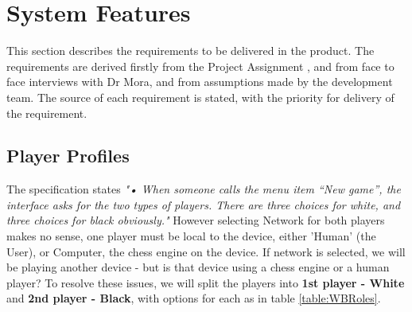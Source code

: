 \documentclass[a4paper,10pt]{article}
\begin{document}
\section{System Features}

This section describes the requirements to be delivered in the product. The requirements are derived firstly from the Project Assignment  , and from face to face interviews with Dr Mora, and from assumptions made by the development team. The source of each requirement is stated, with the priority for delivery of the requirement. 


\subsection{Player Profiles}

The specification states \textit{"• When someone calls the menu item “New game”, the interface asks for the two types of players. There are three choices for white, and three choices for black obviously."}
However selecting Network for both players makes no sense, one player must be local to the device, either 'Human' (the User), or Computer, the chess engine on the device.
If network is selected, we will be playing another device - but is that device using a chess engine or a human player? To resolve these issues, we will split the players into \textbf{1st player - White} and \textbf{2nd player - Black}, with options for each as in table \ref{table:WBRoles}. 
\end{document}
